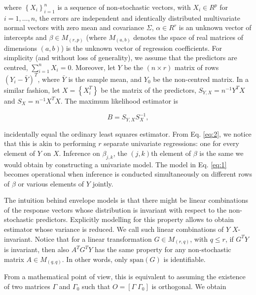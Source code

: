 \documentclass[graybox]{svmult}
\begin{document}
where $\left\{X_i\right\}_{i = 1}^n$ is a sequence of non-stochastic
vectors, with $X_i \in R^p$ for $i = 1, \dots, n$, the errors are
independent and identically distributed multivariate normal vectors
with zero mean and covariance $\Sigma$, $\alpha \in R^r$ is an unknown
vector of intercepts and $\beta \in M_{\left( r, p \right)}$ (where
$M_{\left( a, b \right)}$ denotes the space of real matrices of dimensions
$\left( a, b \right)$) is the unknown vector of regression
coefficients.  For simplicity (and without loss of generality), we
assume that the predictors are centred, $\sum_{i = 1}^n X_i =
0$. Moreover, let $Y$ be the $\left( n \times r \right)$ matrix of
rows $\left(Y_i - \bar{Y}\right)^T$, where $\bar{Y}$ is the sample
mean, and $Y_0$ be the non-centred matrix. In a similar fashion, let
$X = \left\{X_i^T\right\}$ be the matrix of the predictors,
$S_{Y, X} = n^{-1} Y^TX$ and $S_X = n^{-1}X^TX$. The maximum
likelihood estimator is

\begin{equation}
  \label{eq:2}
  B = S_{Y, X}S_X^{-1},
\end{equation}

incidentally equal the ordinary least squares estimator. From Eq.
\ref{eq:2}, we notice that this is akin to performing $r$ separate
univariate regressions: one for every element of $Y$ on $X$. Inference
on $\beta_{j,k}$, the $\left( j, k \right)$th element of $\beta$ is
the same we would obtain by constructing a univariate model. The model
in Eq. \ref{eq:1} becomes operational when inference is conducted
simultaneously on different rows of $\beta$ or various elements of $Y$
jointly.

The intuition behind envelope models is that there might be linear
combinations of the response vectors whose distribution is invariant
with respect to the non-stochastic predictors. Explicitly modelling
for this property allows to obtain estimator whose variance is
reduced. We call such linear combinations of $Y$ $X$-invariant. Notice
that for a linear transformation $G \in M_{\left( r, q \right)}$, with
$q \leq r$, if $G^T Y$ is invariant, then also $A^T G^T Y$ has the
same property for any non-stochastic matrix
$A \in M_{\left( q, q \right)}$. In other words, only
$\mathrm{span}\left( G \right)$ is identifiable.

From a mathematical point of view, this is equivalent to assuming the
existence of two matrices $\Gamma$ and $\Gamma_0$ such that
$O = \left[ \Gamma \;  \Gamma_0 \right]$ is orthogonal. We obtain
\end{document}
